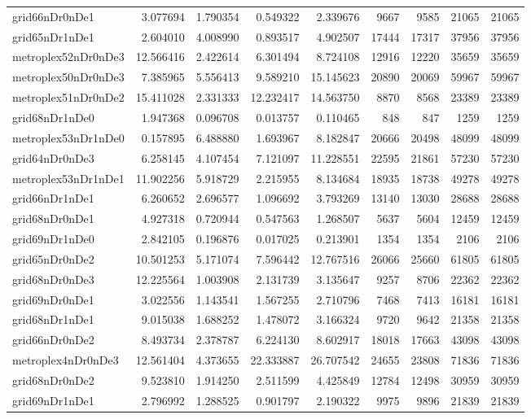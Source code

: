 \begin{longtable}{|l|r|r|r|r|r|r|r|r|}
grid66nDr0nDe1 & 3.077694 & 1.790354 & 0.549322 & 2.339676 & 9667 & 9585 & 21065 & 21065 \\
grid65nDr1nDe1 & 2.604010 & 4.008990 & 0.893517 & 4.902507 & 17444 & 17317 & 37956 & 37956 \\
metroplex52nDr0nDe3 & 12.566416 & 2.422614 & 6.301494 & 8.724108 & 12916 & 12220 & 35659 & 35659 \\
metroplex50nDr0nDe3 & 7.385965 & 5.556413 & 9.589210 & 15.145623 & 20890 & 20069 & 59967 & 59967 \\
metroplex51nDr0nDe2 & 15.411028 & 2.331333 & 12.232417 & 14.563750 & 8870 & 8568 & 23389 & 23389 \\
grid68nDr1nDe0 & 1.947368 & 0.096708 & 0.013757 & 0.110465 & 848 & 847 & 1259 & 1259 \\
metroplex53nDr1nDe0 & 0.157895 & 6.488880 & 1.693967 & 8.182847 & 20666 & 20498 & 48099 & 48099 \\
grid64nDr0nDe3 & 6.258145 & 4.107454 & 7.121097 & 11.228551 & 22595 & 21861 & 57230 & 57230 \\
metroplex53nDr1nDe1 & 11.902256 & 5.918729 & 2.215955 & 8.134684 & 18935 & 18738 & 49278 & 49278 \\
grid66nDr1nDe1 & 6.260652 & 2.696577 & 1.096692 & 3.793269 & 13140 & 13030 & 28688 & 28688 \\
grid68nDr0nDe1 & 4.927318 & 0.720944 & 0.547563 & 1.268507 & 5637 & 5604 & 12459 & 12459 \\
grid69nDr1nDe0 & 2.842105 & 0.196876 & 0.017025 & 0.213901 & 1354 & 1354 & 2106 & 2106 \\
grid65nDr0nDe2 & 10.501253 & 5.171074 & 7.596442 & 12.767516 & 26066 & 25660 & 61805 & 61805 \\
grid68nDr0nDe3 & 12.225564 & 1.003908 & 2.131739 & 3.135647 & 9257 & 8706 & 22362 & 22362 \\
grid69nDr0nDe1 & 3.022556 & 1.143541 & 1.567255 & 2.710796 & 7468 & 7413 & 16181 & 16181 \\
grid68nDr1nDe1 & 9.015038 & 1.688252 & 1.478072 & 3.166324 & 9720 & 9642 & 21358 & 21358 \\
grid66nDr0nDe2 & 8.493734 & 2.378787 & 6.224130 & 8.602917 & 18018 & 17663 & 43098 & 43098 \\
metroplex4nDr0nDe3 & 12.561404 & 4.373655 & 22.333887 & 26.707542 & 24655 & 23808 & 71836 & 71836 \\
grid68nDr0nDe2 & 9.523810 & 1.914250 & 2.511599 & 4.425849 & 12784 & 12498 & 30959 & 30959 \\
grid69nDr1nDe1 & 2.796992 & 1.288525 & 0.901797 & 2.190322 & 9975 & 9896 & 21839 & 21839 \\

\end{longtable}
